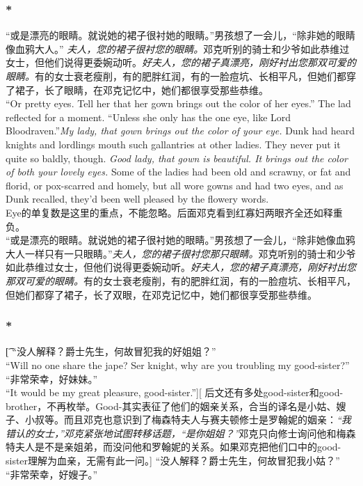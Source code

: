 \documentclass[12pt,a4paper]{article}
\newcommand{\h}[1]{{\color{red}#1}\\}
\newcommand{\la}[1]{{\color{blue}#1}\\}
\begin{document}
\subsubsection{\color{red}*}\la{
	“或是漂亮的眼睛。就说她的裙子很衬她的眼睛。”男孩想了一会儿，“除非她的眼睛像血鸦大人。” \emph{夫人，您的裙子很衬您的眼睛。}邓克听别的骑士和少爷如此恭维过女士，但他们说得更委婉动听。\emph{好夫人，您的裙子真漂亮，刚好衬出您那双可爱的眼睛。}有的女士衰老瘦削，有的肥胖红润，有的一脸痘坑、长相平凡，但她们都穿了裙子，长了眼睛，在邓克记忆中，她们都很享受那些恭维。\\
	“Or pretty eyes. Tell her that her gown brings out the color of her eyes.” The lad reflected for a moment. “Unless she only has the one eye, like Lord Bloodraven.”\emph{My lady, that gown brings out the color of your eye.} Dunk had heard knights and lordlings mouth such gallantries at other ladies. They never put it quite so baldly, though. \emph{Good lady, that gown is beautiful. It brings out the color of both your lovely eyes.} Some of the ladies had been old and scrawny, or fat and florid, or pox-scarred and homely, but all wore gowns and had two eyes, and as Dunk recalled, they'd been well pleased by the flowery words.}\h{
	Eye的单复数是这里的重点，不能忽略。后面邓克看到红寡妇两眼齐全还如释重负。}
	“或是漂亮的眼睛。就说她的裙子很衬她的眼睛。”男孩想了一会儿，“除非她像血鸦大人一样只有一只眼睛。”\emph{夫人，您的裙子很衬您那只眼睛。}邓克听别的骑士和少爷如此恭维过女士，但他们说得更委婉动听。\emph{好夫人，您的裙子真漂亮，刚好衬出您那双可爱的眼睛。}有的女士衰老瘦削，有的肥胖红润，有的一脸痘坑、长相平凡，但她们都穿了裙子，长了双眼，在邓克记忆中，她们都很享受那些恭维。
	
\subsubsection{\color{red}*}\t[	
	“没人解释？爵士先生，何故冒犯我的好姐姐？”\\
	“Will no one share the jape? Ser knight, why are you troubling my good-sister?”\\
	“非常荣幸，好妹妹。”\\
	“It would be my great pleasure, good-sister.”][
	后文还有多处good-sister和good-brother，不再枚举。Good-其实表征了他们的姻亲关系，合当的译名是小姑、嫂子、小叔等。而且邓克也意识到了梅森特夫人与赛夫顿修士是罗翰妮的姻亲：\emph{“我错认的女士，”邓克紧张地试图转移话题，“是你姐姐？”}邓克只向修士询问他和梅森特夫人是不是亲姐弟，而没问他和罗翰妮的关系。如果邓克把他们口中的good-sister理解为血亲，无需有此一问。]
	“没人解释？爵士先生，何故冒犯我小姑？”\\
	“非常荣幸，好嫂子。”
	
\end{document}

